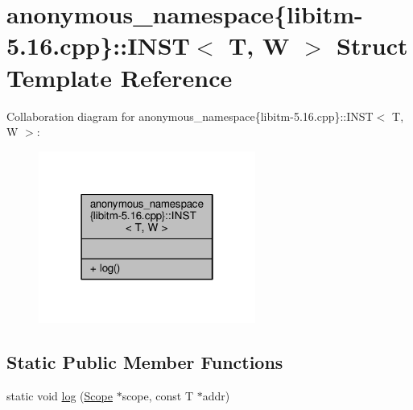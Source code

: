 \hypertarget{structanonymous__namespace_02libitm-5_816_8cpp_03_1_1INST}{\section{anonymous\-\_\-namespace\{libitm-\/5.16.cpp\}\-:\-:I\-N\-S\-T$<$ T, W $>$ Struct Template Reference}
\label{structanonymous__namespace_02libitm-5_816_8cpp_03_1_1INST}
}


Collaboration diagram for anonymous\-\_\-namespace\{libitm-\/5.16.cpp\}\-:\-:I\-N\-S\-T$<$ T, W $>$\-:
\nopagebreak
\begin{figure}[H]
\begin{center}
\leavevmode
\includegraphics[width=202pt]{structanonymous__namespace_02libitm-5_816_8cpp_03_1_1INST__coll__graph}
\end{center}
\end{figure}
\subsection*{Static Public Member Functions}
\begin{DoxyCompactItemize}
\item 
static void \hyperlink{structanonymous__namespace_02libitm-5_816_8cpp_03_1_1INST_a901aa77a71f5ed4bc71b0a82c6262e62}{log} (\hyperlink{classitm2stm_1_1Scope}{Scope} $\ast$scope, const T $\ast$addr)
\end{DoxyCompactItemize}


